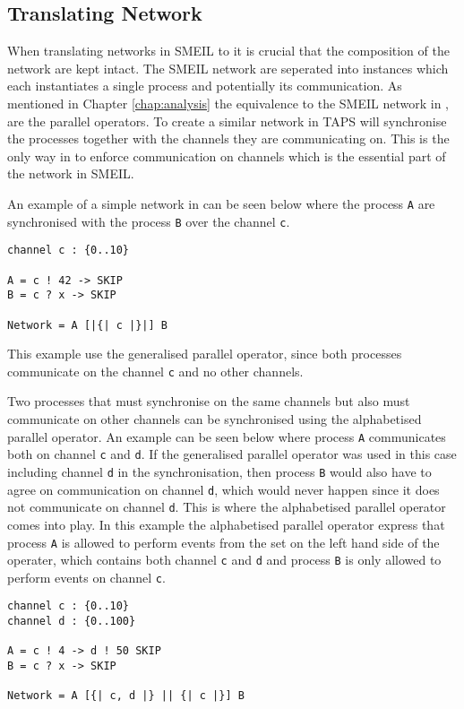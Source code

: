 \subsection{Translating Network}
\label{sec:design_translating_network}
When translating networks in SMEIL to \cspm{} it is crucial that the composition of the network are kept intact. The SMEIL network are seperated into instances which each instantiates a single process and potentially its communication. As mentioned in Chapter \ref{chap:analysis} the equivalence to the SMEIL network in \cspm{}, are the parallel operators. To create a similar network in \cspm{} TAPS will synchronise the processes together with the channels they are communicating on.
This is the only way in \cspm{} to enforce communication on channels which is the essential part of the network in SMEIL.

An example of a simple network in \cspm{} can be seen below where the process \texttt{A} are synchronised with the process \texttt{B} over the channel \texttt{c}.
\begin{verbatim}
channel c : {0..10}

A = c ! 42 -> SKIP
B = c ? x -> SKIP

Network = A [|{| c |}|] B
\end{verbatim}
This example use the generalised parallel operator, since both processes communicate on the channel \texttt{c} and no other channels.

Two processes that must synchronise on the same channels but also must communicate on other channels can be synchronised using the alphabetised parallel operator. An example can be seen below where process \texttt{A} communicates both on channel \texttt{c} and \texttt{d}. If the generalised parallel operator was used in this case including channel \texttt{d} in the synchronisation, then process \texttt{B} would also have to agree on communication on channel \texttt{d}, which would never happen since it does not communicate on channel \texttt{d}. This is where the alphabetised parallel operator comes into play. In this example the alphabetised parallel operator express that process \texttt{A} is allowed to perform events from the set on the left hand side of the operater, which contains both channel \texttt{c} and \texttt{d} and process \texttt{B} is only allowed to perform events on channel \texttt{c}.
\begin{verbatim}
channel c : {0..10}
channel d : {0..100}

A = c ! 4 -> d ! 50 SKIP
B = c ? x -> SKIP

Network = A [{| c, d |} || {| c |}] B
\end{verbatim}

